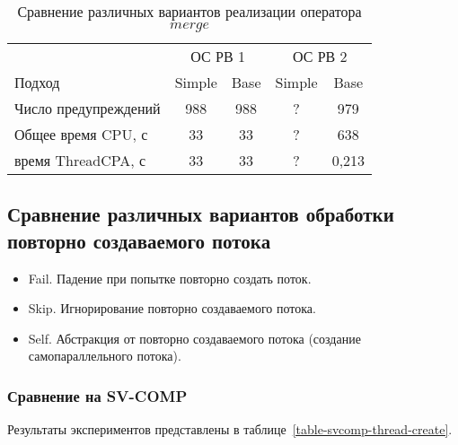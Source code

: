 \begin{center}
  \begin{table}[h]\footnotesize \centering
  	\label{table-os-thread}
    \caption{Сравнение различных вариантов реализации оператора $merge$}
    \begin{tabular}{ | l | c | c | c | c |}
      \hline
      		& 		\multicolumn{2}{|c|}{ОС РВ 1} & \multicolumn{2}{|c|}{ОС РВ 2} \\
      Подход         					& Simple 	& Base 	& Simple 	& Base 		\\ \hline
      Число предупреждений 				& 988    	& 988   & ?       & 979  		\\ 
      Общее время CPU, с				& 33      	& 33    & ?       & 638  		\\ 
  \hspace{0.5cm} время ThreadCPA, с 	& 33 		& 33    & ?      & 0,213   	\\
      \hline
    \end{tabular}
  \end{table}
\end{center}

\subsection{Сравнение различных вариантов обработки повторно создаваемого потока }

\begin{itemize}
\item Fail. Падение при попытке повторно создать поток.
\item Skip. Игнорирование повторно создаваемого потока.
\item Self. Абстракция от повторно создаваемого потока (создание самопараллельного потока).
\end{itemize}

\subsubsection{Сравнение на SV-COMP}
Результаты экспериментов представлены в таблице~\ref{table-svcomp-thread-create}.

